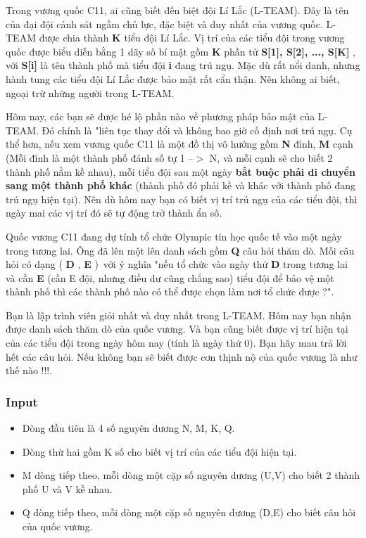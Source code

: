 



   Trong vương quốc C11, ai cũng biết đến biệt đội Lí Lắc (L-TEAM). Đây là tên của đại đội cảnh sát ngầm chủ lực, đặc biệt và duy nhất của vương quốc. L-TEAM được chia thành   \textbf{    K   }   tiểu đội Lí Lắc. Vị trí của các tiểu đội trong vương quốc được biểu diễn bằng 1 dãy số bí mật gồm   \textbf{    K   }   phần tử   \textbf{    S[1], S[2], ..., S[K]   }   , với   \textbf{    S[i]   }   là tên thành phố mà tiểu đội   \textbf{    i   }   đang trú ngụ. Mặc dù rất nổi danh, nhưng hành tung các tiểu đội Lí Lắc được bảo mật rất cẩn thận. Nên không ai biết, ngoại trừ những người trong L-TEAM.  

   Hôm nay, các bạn sẽ được hé lộ phần nào về phương pháp bảo mật của L-TEAM. Đó chính là "liên tục thay đổi và không bao giờ cố định nơi trú ngụ. Cụ thể hơn, nếu xem vương quốc C11 là một đồ thị vô hướng gồm   \textbf{    N   }   đỉnh,   \textbf{    M   }   cạnh (Mỗi đỉnh là một thành phố đánh số tự 1 --$>$ N, và mỗi cạnh sẽ cho biết 2 thành phố nằm kề nhau),   mỗi tiểu đội sau một ngày    \textbf{     bắt buộc    phải di chuyển sang một thành phố khác   }   (thành phố đó phải kề và khác với thành phố đang trú ngụ hiện tại). Nên dù hôm nay bạn có biết vị trí trú ngụ của các tiểu đội, thì ngày mai các vị trí đó sẽ tự động trở thành ẩn số.  

   Quốc vương C11 đang dự tính tổ chức Olympic tin học quốc tế vào một ngày trong tương lai. Ông đã lên một lên danh sách gồm   \textbf{    Q   }   câu hỏi thăm dò. Mỗi câu hỏi có dạng   \textbf{}   (   \textbf{    D   }   ,   \textbf{    E   }   ) với ý nghĩa "nếu tổ chức vào ngày thứ   \textbf{    D   }   trong tương lai và cần   \textbf{    E   }   (cần E đội, nhưng điều dư cũng chẳng sao) tiểu đội để bảo vệ một thành phố thì các thành phố nào có thể được chọn làm nơi tổ chức được ?".  

   Bạn là lập trình viên giỏi nhất và duy nhất trong L-TEAM. Hôm nay bạn nhận được danh sách thăm dò của quốc vương. Và bạn cũng biết được vị trí hiện tại của các tiểu đội trong ngày hôm nay (tính là ngày thứ 0). Bạn hãy mau trả lời hết các câu hỏi. Nếu không bạn sẽ biết được cơn thịnh nộ của quốc vương là như thế nào !!!.  

\subsubsection{   Input  }
\begin{itemize}
	\item     Dòng đầu tiên là 4 số nguyên dương N, M, K, Q.   
	\item     Dòng thừ hai gồm K số cho biết vị trí của các tiểu đội hiện tại.   
	\item     M dòng tiếp theo, mỗi dòng một cặp số nguyên dương (U,V) cho biết 2 thành phố U và V kề nhau.   
	\item     Q dòng tiếp theo, mỗi dòng một cặp số nguyên dương (D,E) cho biết câu hỏi của quốc vương.   
\end{itemize}

